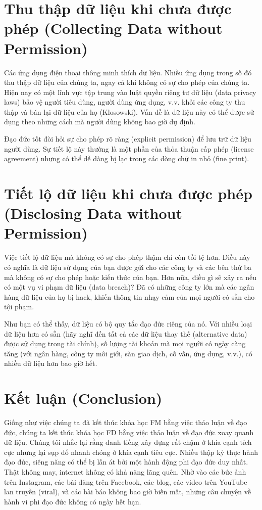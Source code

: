\section{Thu thập dữ liệu khi chưa được phép (Collecting Data without Permission)}

Các ứng dụng điện thoại thông minh thích dữ liệu. Nhiều ứng dụng trong số đó thu thập dữ liệu của chúng ta, ngay cả khi không có sự cho phép của chúng ta. Hiện nay có một lĩnh vực tập trung vào luật quyền riêng tư dữ liệu (data privacy laws) bảo vệ người tiêu dùng, người dùng ứng dụng, v.v. khỏi các công ty thu thập và bán lại dữ liệu của họ (Klosowski). Vấn đề là dữ liệu này có thể được sử dụng theo những cách mà người dùng không bao giờ dự định.

Đạo đức tốt đòi hỏi sự cho phép rõ ràng (explicit permission) để lưu trữ dữ liệu người dùng. Sự tiết lộ này thường là một phần của thỏa thuận cấp phép (license agreement) nhưng có thể dễ dàng bị lạc trong các dòng chữ in nhỏ (fine print).

\section{Tiết lộ dữ liệu khi chưa được phép (Disclosing Data without Permission)}

Việc tiết lộ dữ liệu mà không có sự cho phép thậm chí còn tồi tệ hơn. Điều này có nghĩa là dữ liệu sử dụng của bạn được gửi cho các công ty và các bên thứ ba mà không có sự cho phép hoặc kiến thức của bạn. Hơn nữa, điều gì sẽ xảy ra nếu có một vụ vi phạm dữ liệu (data breach)? Đã có những công ty lớn mà các ngân hàng dữ liệu của họ bị hack, khiến thông tin nhạy cảm của mọi người có sẵn cho tội phạm.

Như bạn có thể thấy, dữ liệu có bộ quy tắc đạo đức riêng của nó. Với nhiều loại dữ liệu hơn có sẵn (hãy nghĩ đến tất cả các dữ liệu thay thế (alternative data) được sử dụng trong tài chính), số lượng tài khoản mà mọi người có ngày càng tăng (với ngân hàng, công ty môi giới, sàn giao dịch, cố vấn, ứng dụng, v.v.), có nhiều dữ liệu hơn bao giờ hết.

\section{Kết luận (Conclusion)}

Giống như việc chúng ta đã kết thúc khóa học FM bằng việc thảo luận về đạo đức, chúng ta kết thúc khóa học FD bằng việc thảo luận về đạo đức xoay quanh dữ liệu. Chúng tôi nhắc lại rằng danh tiếng xây dựng rất chậm ở khía cạnh tích cực nhưng lại sụp đổ nhanh chóng ở khía cạnh tiêu cực. Nhiều thập kỷ thực hành đạo đức, siêng năng có thể bị lấn át bởi một hành động phi đạo đức duy nhất. Thật không may, internet không có khả năng lãng quên. Nhờ vào các bức ảnh trên Instagram, các bài đăng trên Facebook, các blog, các video trên YouTube lan truyền (viral), và các bài báo không bao giờ biến mất, những câu chuyện về hành vi phi đạo đức không có ngày hết hạn.

